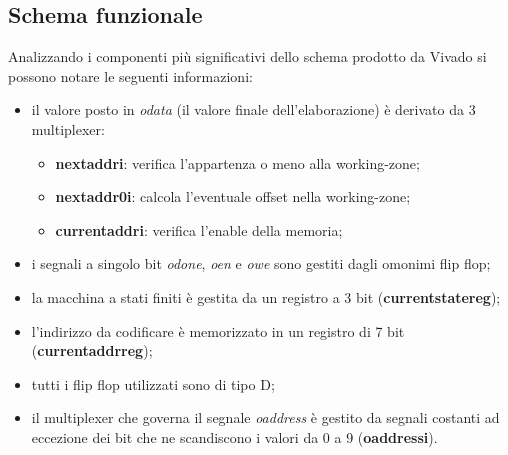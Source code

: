 \documentclass{article}
\begin{document}
\subsection{Schema funzionale}
Analizzando i componenti più significativi dello schema prodotto da Vivado si possono notare le seguenti informazioni:
\begin{itemize}
	\item il valore posto in \textit{o\textunderscore data} (il valore finale dell'elaborazione) è derivato da 3 multiplexer:
	\begin{itemize}
		\item \textbf{next\textunderscore addr\textunderscore i}: verifica l'appartenza o meno alla working-zone;
		\item \textbf{next\textunderscore addr0\textunderscore i}: calcola l'eventuale offset nella working-zone;
		\item \textbf{current\textunderscore addr\textunderscore i}: verifica l'enable della memoria;
	\end{itemize} 
	\item i segnali a singolo bit \textit{o\textunderscore done}, \textit{o\textunderscore en} e \textit{o\textunderscore we} sono gestiti dagli omonimi flip flop;
	\item la macchina a stati finiti è gestita da un registro a 3 bit (\textbf{current\textunderscore state\textunderscore reg});
	\item l'indirizzo da codificare è memorizzato in un registro di 7 bit (\textbf{current\textunderscore addr\textunderscore reg});
	\item tutti i flip flop utilizzati sono di tipo D;
	\item il multiplexer che governa il segnale \textit{o\textunderscore address} è gestito da segnali costanti ad eccezione dei bit che ne scandiscono i valori da 0 a 9 (\textbf{o\textunderscore address\textunderscore i\textunderscore {}}).
\end{itemize}
\end{document}
